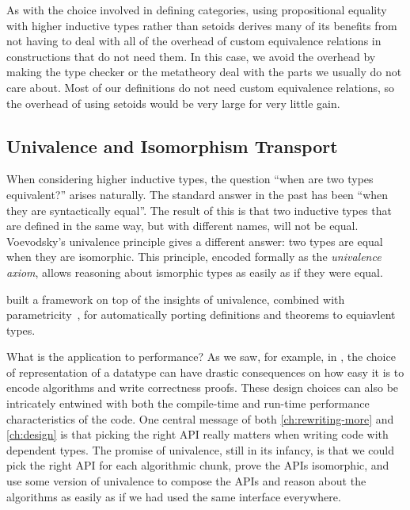 As with the choice involved in defining categories, using propositional equality with higher inductive types rather than setoids derives many of its benefits from not having to deal with all of the overhead of custom equivalence relations in constructions that do not need them.
In this case, we avoid the overhead by making the type checker or the metatheory deal with the parts we usually do not care about.
Most of our definitions do not need custom equivalence relations, so the overhead of using setoids would be very large for very little gain.

\subsection{Univalence and Isomorphism Transport}\label{sec:fixes:theory:univalence}\label{sec:univalence}
When considering higher inductive types, the question ``when are two types equivalent?'' arises naturally.
The standard answer in the past has been ``when they are syntactically equal''.
The result of this is that two inductive types that are defined in the same way, but with different names, will not be equal.
Voevodsky's univalence principle gives a different answer: two types are equal when they are isomorphic.
This principle, encoded formally as the \emph{univalence axiom}, allows reasoning about ismorphic types as easily as if they were equal.

 built a framework on top of the insights of univalence, combined with parametricity~\cite{reynolds1983types,wadler1989theorems}, for automatically porting definitions and theorems to equiavlent types.~\cite{Equivalences2018Tabareau,Tabareau2019TheMO}

What is the application to performance?
As we saw, for example, in , the choice of representation of a datatype can have drastic consequences on how easy it is to encode algorithms and write correctness proofs.
These design choices can also be intricately entwined with both the compile-time and run-time performance characteristics of the code.
One central message of both \autoref{ch:rewriting-more} and \autoref{ch:design} is that picking the right API really matters when writing code with dependent types.
The promise of univalence, still in its infancy, is that we could pick the right API for each algorithmic chunk, prove the APIs isomorphic, and use some version of univalence to compose the APIs and reason about the algorithms as easily as if we had used the same interface everywhere.

